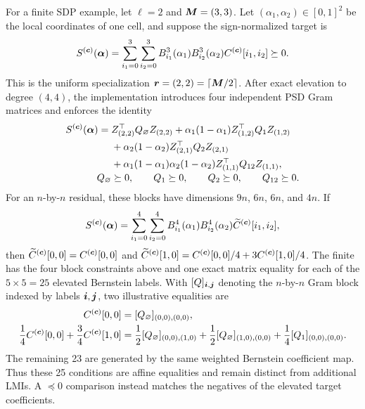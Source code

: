 For a finite SDP example, let $\ell=2$ and $\boldsymbol{M}=(3,3)$. Let $(\alpha_1,\alpha_2)\in[0,1]^2$ be the local coordinates of one cell, and suppose the sign-normalized target is
\begin{gather*}
  S^{(\boldsymbol{c})}(\boldsymbol{\alpha})=
  \sum_{i_1=0}^3\sum_{i_2=0}^3
    B_{i_1}^3(\alpha_1)B_{i_2}^3(\alpha_2)
    C^{(\boldsymbol{c})}[i_1,i_2]\succeq0.
\end{gather*}
This is the uniform specialization $\boldsymbol{r}=(2,2)=\lceil\boldsymbol{M}/2\rceil$. After exact elevation to degree $(4,4)$, the implementation introduces four independent PSD Gram matrices and enforces the identity
\begin{gather*}
  \begin{aligned}
    S^{(\boldsymbol{c})}(\boldsymbol{\alpha})={}&
      Z_{(2,2)}^\top Q_{\varnothing}Z_{(2,2)}
      +\alpha_1(1-\alpha_1)Z_{(1,2)}^\top Q_1Z_{(1,2)}\\
      &+\alpha_2(1-\alpha_2)Z_{(2,1)}^\top Q_2Z_{(2,1)}\\
      &+\alpha_1(1-\alpha_1)\alpha_2(1-\alpha_2)
        Z_{(1,1)}^\top Q_{12}Z_{(1,1)},\\[-1mm]
    Q_{\varnothing}&\succeq0,\qquad Q_1\succeq0,\qquad
      Q_2\succeq0,\qquad Q_{12}\succeq0.
  \end{aligned}
\end{gather*}
For an $n$-by-$n$ residual, these blocks have dimensions $9n$, $6n$, $6n$, and $4n$.  If
\begin{gather*}
  S^{(\boldsymbol{c})}(\boldsymbol{\alpha})=
  \sum_{i_1=0}^4\sum_{i_2=0}^4
    B_{i_1}^4(\alpha_1)B_{i_2}^4(\alpha_2)
    \widetilde C^{(\boldsymbol{c})}[i_1,i_2],
\end{gather*}
then $\widetilde C^{(\boldsymbol{c})}[0,0]=C^{(\boldsymbol{c})}[0,0]$ and $\widetilde C^{(\boldsymbol{c})}[1,0]=C^{(\boldsymbol{c})}[0,0]/4+3C^{(\boldsymbol{c})}[1,0]/4$. The finite  has the four  block constraints above and one exact matrix equality for each of the $5\times5=25$ elevated Bernstein labels. With $[Q]_{\boldsymbol{i},\boldsymbol{j}}$ denoting the $n$-by-$n$ Gram block indexed by labels $\boldsymbol{i},\boldsymbol{j}$, two illustrative equalities are
\begin{gather*}
  \begin{aligned}
    C^{(\boldsymbol{c})}[0,0]={}&[Q_{\varnothing}]_{(0,0),(0,0)},\\
    \frac14C^{(\boldsymbol{c})}[0,0]+\frac34C^{(\boldsymbol{c})}[1,0]={}&
      \frac12[Q_{\varnothing}]_{(0,0),(1,0)}
      +\frac12[Q_{\varnothing}]_{(1,0),(0,0)}
      +\frac14[Q_1]_{(0,0),(0,0)}.
  \end{aligned}
\end{gather*}
The remaining 23 are generated by the same weighted Bernstein coefficient map. Thus these 25 conditions are affine equalities and remain distinct from additional LMIs. A $\preceq0$ comparison instead matches the negatives of the elevated target coefficients.

